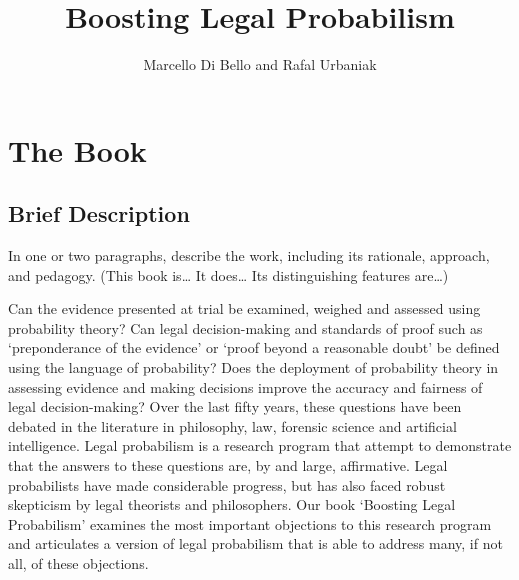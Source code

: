 \documentclass[
  10pt,
  dvipsnames,enabledeprecatedfontcommands]{scrartcl}
\title{Boosting Legal Probabilism}
\author{Marcello Di Bello and Rafal Urbaniak}
\date{}
\begin{document}
\maketitle

\hypertarget{the-book}{%
\section{The Book}\label{the-book}}

\hypertarget{brief-description}{%
\subsection{Brief Description}\label{brief-description}}

\footnotesize In one or two paragraphs, describe the work, including its
rationale, approach, and pedagogy. (This book is\ldots{} It does\ldots{}
Its distinguishing features are\ldots)

\normalsize

Can the evidence presented at trial be examined, weighed and assessed
using probability theory? Can legal decision-making and standards of
proof such as `preponderance of the evidence' or `proof beyond a
reasonable doubt' be defined using the language of probability? Does the
deployment of probability theory in assessing evidence and making
decisions improve the accuracy and fairness of legal decision-making?
Over the last fifty years, these questions have been debated in the
literature in philosophy, law, forensic science and artificial
intelligence. Legal probabilism is a research program that attempt to
demonstrate that the answers to these questions are, by and large,
affirmative. Legal probabilists have made considerable progress, but has
also faced robust skepticism by legal theorists and philosophers. Our
book `Boosting Legal Probabilism' examines the most important objections
to this research program and articulates a version of legal probabilism
that is able to address many, if not all, of these objections.
\end{document}
